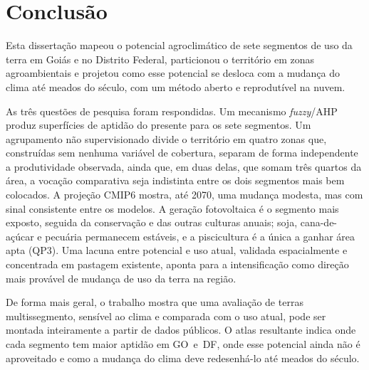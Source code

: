 \section{Conclusão}\label{sec:conclusion}

Esta dissertação mapeou o potencial agroclimático de sete segmentos de uso da terra em Goiás e
no Distrito Federal, particionou o território em zonas agroambientais e projetou como esse
potencial se desloca com a mudança do clima até meados do século, com um método aberto e
reprodutível na nuvem.

As três questões de pesquisa foram respondidas. Um mecanismo \emph{fuzzy}/AHP produz superfícies de
aptidão do presente para os sete segmentos. Um agrupamento não supervisionado divide o território em
quatro zonas que, construídas sem nenhuma variável de cobertura, separam de forma independente a
produtividade observada, ainda que, em duas delas, que somam três quartos da área, a vocação
comparativa seja indistinta entre os dois segmentos mais bem colocados. A projeção CMIP6 mostra, até
2070, uma mudança modesta, mas com sinal consistente entre os modelos. A geração fotovoltaica é o
segmento mais exposto, seguida da conservação e das outras culturas anuais; soja, cana-de-açúcar e
pecuária permanecem estáveis, e a piscicultura é a única a ganhar área apta (QP3). Uma lacuna entre
potencial e uso atual, validada espacialmente e concentrada em pastagem existente, aponta para a
intensificação como direção mais provável de mudança de uso da terra na região.

De forma mais geral, o trabalho mostra que uma avaliação de terras multissegmento, sensível ao
clima e comparada com o uso atual, pode ser montada inteiramente a partir de dados públicos. O
atlas resultante indica onde cada segmento tem maior aptidão em GO~e~DF, onde esse potencial ainda não
é aproveitado e como a mudança do clima deve redesenhá-lo até meados do século.
